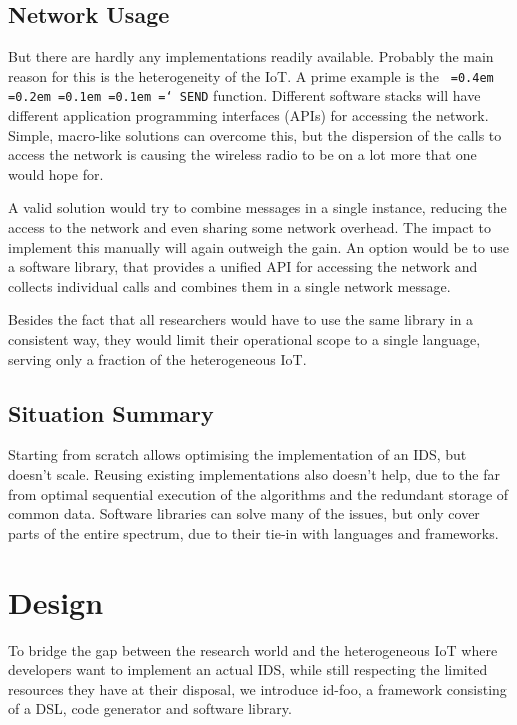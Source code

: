 \documentclass[conference]{IEEEtran}
\newcommand{\NAME}{id-foo\xspace}
\newcommand*\justify{%
  \fontdimen2\font=0.4em%
  \fontdimen3\font=0.2em%
  \fontdimen4\font=0.1em%
  \fontdimen7\font=0.1em%
  \hyphenchar\font=`\-%
}
\newcommand{\ttt}[1]{\texttt{\justify{#1}}}
\begin{document}
\subsection{Network Usage}

But there are hardly any implementations readily available. Probably the main
reason for this is the heterogeneity of the IoT. A prime example is the
\ttt{SEND} function. Different software stacks will have different application
programming interfaces (APIs) for accessing the network. Simple, macro-like
solutions can overcome this, but the dispersion of the calls to access the
network is causing the wireless radio to be on a lot more that one would hope
for.

A valid solution would try to combine messages in a single instance, reducing
the access to the network and even sharing some network overhead. The impact to
implement this manually will again outweigh the gain. An option would be to use
a software library, that provides a unified API for accessing the network and
collects individual calls and combines them in a single network message.

Besides the fact that all researchers would have to use the same library in a
consistent way, they would limit their operational scope to a single language,
serving only a fraction of the heterogeneous IoT.

\subsection{Situation Summary}

Starting from scratch allows optimising the implementation of an IDS, but
doesn't scale. Reusing existing implementations also doesn't help, due to the
far from optimal sequential execution of the algorithms and the redundant
storage of common data. Software libraries can solve many of the issues, but
only cover parts of the entire spectrum, due to their tie-in with languages and
frameworks.

\section{Design}
\label{design}

To bridge the gap between the research world and the heterogeneous IoT where
developers want to implement an actual IDS, while still respecting the limited
resources they have at their disposal, we introduce \NAME, a framework
consisting of a DSL, code generator and software library.
\end{document}
